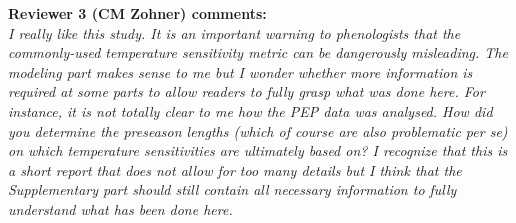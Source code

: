 \documentclass[11pt]{article}
\begin{document}
{\bf Reviewer 3 (CM Zohner) comments:} \\

\emph{I really like this study. It is an important warning to phenologists that the commonly-used temperature sensitivity metric can be dangerously misleading. The modeling part makes sense to me but I wonder whether more information is required at some parts to allow readers to fully grasp what was done here. For instance, it is not totally clear to me how the PEP data was analysed. How did you determine the preseason lengths (which of course are also problematic per se) on which temperature sensitivities are ultimately based on? I recognize that this is a short report that does not allow for too many details but I think that the Supplementary part should still contain all necessary information to fully understand what has been done here.}\\
\end{document}
